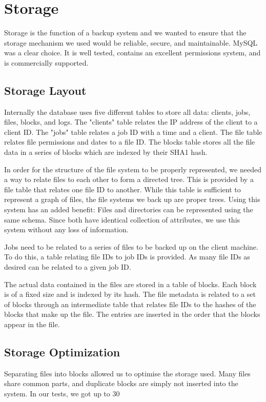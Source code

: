 \section*{Storage}
Storage is the function of a backup system and we wanted to ensure that the storage mechanism we used would be reliable, secure, and maintainable. MySQL was a clear choice. It is well tested, contains an excellent permissions system, and is commercially supported. 
\subsection*{Storage Layout}
Internally the database uses five different tables to store all data: clients, jobs, files, blocks, and logs. The "clients" table relates the IP address of the client to a client ID. The "jobs" table relates a job ID  with a time and a client. The file table relates file permissions and dates to a file ID. The blocks table stores all the file data in a series of blocks which are indexed by their SHA1 hash.

In order for the structure of the file system to be properly represented, we needed a way to relate files to each other to form a directed tree. This is provided by a file table that relates one file ID to another. While this table is sufficient to represent a graph of files, the file systems we back up are proper trees. Using this system has an added benefit: Files and directories can be represented using the same schema. Since both have identical collection of attributes, we use this system without any loss of information.

Jobs need to be related to a series of files to be backed up on the client machine. To do this, a table relating file IDs to job IDs is provided. As many file IDs as desired can be related to a given job ID.

The actual data contained in the files are stored in a table of blocks. Each block is of a fixed size and is indexed by its hash. The file metadata is related to a set of blocks through an intermediate table that relates file IDs to the hashes of the blocks that make up the file. The entries are inserted in the order that the blocks appear in the file.

\subsection*{Storage Optimization}
Separating files into blocks allowed us to optimise the storage used. Many files share common parts, and duplicate blocks are simply not inserted into the system. In our tests, we got up to 30%
